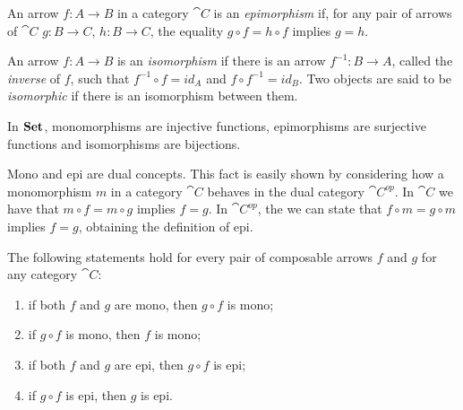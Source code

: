 \begin{definition}[Epimorphism]\label{def:epi}
    An arrow $f: A\rightarrow B$ in a category $\cat{C}$ is an \emph{epimorphism} if, for any pair of arrows of $\cat{C}$ $g : B \rightarrow C$, $h: B \rightarrow C$, the equality $g \circ f = h \circ f$ implies $g = h$.
\end{definition}

\begin{definition}[Isomorphism]\label{def:iso}
    An arrow $f:A \rightarrow B$ is an \emph{isomorphism} if there is an arrow $f^{-1}:B \rightarrow A$, called the \emph{inverse} of $f$, such that $f^{-1}\circ f = id_{A}$ and $f \circ f^{-1} = id_{B}$. Two objects are said to be \emph{isomorphic} if there is an isomorphism between them.
\end{definition}

\begin{example}
    In $\mathbf{Set}$, monomorphisms are injective functions, epimorphisms are surjective functions and isomorphisms are bijections.
\end{example}

\begin{remark}
    Mono and epi are dual concepts. This fact is easily shown by considering how a monomorphism $m$ in a category $\cat C$ behaves in the dual category $\cat C^{op}$.
    In $\cat C$ we have that $m \circ f = m \circ g$ implies $f = g$. In $\cat C^{op}$, the we can state that $f \circ m = g \circ m$ implies $f = g$, obtaining the definition of epi. 
\end{remark}

\begin{prop}\label{prop:epi_mono_prop}
    The following statements hold for every pair of composable arrows $f$ and $g$ for any category $\cat C$:
    \begin{enumerate}
        \item if both $f$ and $g$ are mono, then $g \circ f$ is mono;
        \item if $g \circ f$ is mono, then $f$ is mono;
        \item if both $f$ and $g$ are epi, then $g \circ f$ is epi;
        \item if $g \circ f$ is epi, then $g$ is epi.
    \end{enumerate}
\end{prop}


